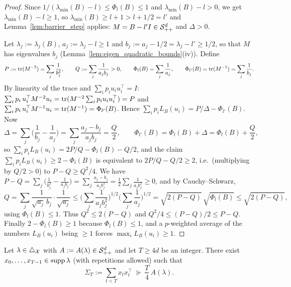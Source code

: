 \begin{proof}
\leanok
{}
Since $1/(\lambda_{\min}(B) - l) \le \Phi_l(B) \le 1$ and $\lambda_{\min}(B) - l > 0$, we get
$\lambda_{\min}(B) - l \ge 1$, so $\lambda_{\min}(B) \ge l + 1 > l + 1/2 = l'$ and
Lemma~\ref{lem:barrier_step} applies: $M = B - l'I \in \mathcal{S}_{++}^{d}$ and $\Delta > 0$.

Let $\lambda_j := \lambda_j(B)$, $a_j := \lambda_j - l \ge 1$ and $b_j := a_j - 1/2 = \lambda_j - l'
\ge 1/2$, so that $M$ has eigenvalues $b_j$ (Lemma~\ref{lem:eigen_quadratic_bounds}(iv)). Define
\[
  P := \operatorname{tr}(M^{-2}) = \sum_j\frac{1}{b_j^2},\qquad
  Q := \sum_j\frac{1}{a_jb_j} > 0,\qquad
  \Phi_l(B) = \sum_j\frac1{a_j},\qquad \Phi_{l'}(B) = \operatorname{tr}(M^{-1}) = \sum_j\frac1{b_j} .
\]
By linearity of the trace and $\sum_ip_iu_iu_i^\top = I$: $\sum_ip_i\,u_i^\top M^{-2}u_i =
\operatorname{tr}(M^{-2}\sum_ip_iu_iu_i^\top) = P$ and $\sum_ip_i\,u_i^\top M^{-1}u_i = \operatorname{tr}(M^{-1}) =
\Phi_{l'}(B)$. Hence $\sum_ip_iL_B(u_i) = P/\Delta - \Phi_{l'}(B)$. Now
\[
  \Delta = \sum_j\Big(\frac1{b_j} - \frac1{a_j}\Big) = \sum_j\frac{a_j - b_j}{a_jb_j} = \frac{Q}{2},
  \qquad
  \Phi_{l'}(B) = \Phi_l(B) + \Delta = \Phi_l(B) + \frac Q2 ,
\]
so $\sum_ip_iL_B(u_i) = 2P/Q - \Phi_l(B) - Q/2$, and the claim $\sum_ip_iL_B(u_i) \ge 2 - \Phi_l(B)$
is equivalent to $2P/Q - Q/2 \ge 2$, i.e.\ (multiplying by $Q/2 > 0$) to $P - Q \ge Q^2/4$.
We have $P - Q = \sum_j\big(\tfrac1{b_j^2} - \tfrac1{a_jb_j}\big) = \sum_j\tfrac{a_j-b_j}{a_jb_j^2} =
\tfrac12\sum_j\tfrac1{a_jb_j^2} \ge 0$, and by Cauchy--Schwarz,
\[
  Q = \sum_j\frac{1}{\sqrt{a_j}\,b_j}\cdot\frac{1}{\sqrt{a_j}}
  \le \Big(\sum_j\frac1{a_jb_j^2}\Big)^{1/2}\Big(\sum_j\frac1{a_j}\Big)^{1/2}
  = \sqrt{2(P-Q)}\,\sqrt{\Phi_l(B)} \le \sqrt{2(P-Q)} ,
\]
using $\Phi_l(B) \le 1$. Thus $Q^2 \le 2(P - Q)$ and $Q^2/4 \le (P-Q)/2 \le P - Q$. Finally
$2 - \Phi_l(B) \ge 1$ because $\Phi_l(B) \le 1$, and a $p$-weighted average of the numbers
$L_B(u_i)$ being $\ge 1$ forces $\max_iL_B(u_i) \ge 1$.
\end{proof}

\begin{theorem}\label{thm:rounding}
\leanok
{}
Let $\lambda \in \triangle_{\mathcal{X}}$ with $A := A(\lambda) \in \mathcal{S}_{++}^{d}$ and let $T \ge 4d$ be an integer.
There exist $x_0, \dots, x_{T-1} \in \operatorname{supp}\lambda$ (with repetitions allowed) such that
\[
  \Sigma_T := \sum_{t<T}x_tx_t^\top \ \succeq\ \frac T4\,A(\lambda) .
\]
\end{theorem}

